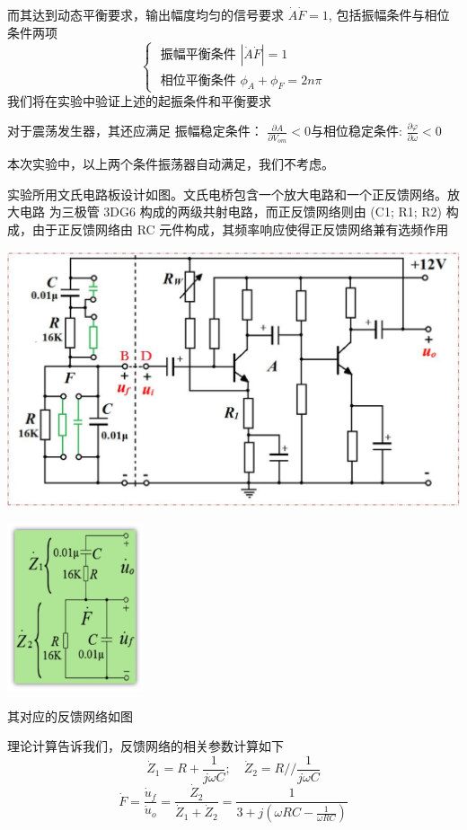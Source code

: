 \documentclass[a4paper,11pt,UTF8]{ctexart}
\begin{document}
而其达到动态平衡要求，输出幅度均匀的信号要求 $\dot{A} \dot{F}=1$, 包括振幅条件与相位条件两项
$$
\left\{\begin{array}{l}
	\text { 振幅平衡条件 }|\dot{A} \dot{F}|=1 \\
	\text { 相位平衡条件 } \phi_{A}+\phi_{F}=2 n \pi
\end{array}\right.
$$
我们将在实验中验证上述的起振条件和平衡要求

对于震荡发生器，其还应满足
振幅稳定条件： $\frac{\partial A}{\partial V_{o m}}<0$与相位稳定条件: $\frac{\partial \varphi}{\partial \omega}<0$


本次实验中，以上两个条件振荡器自动满足，我们不考虑。



实验所用文氏电路板设计如图。文氏电桥包含一个放大电路和一个正反馈网络。放大电路
为三极管 3DG6 构成的两级共射电路，而正反馈网络则由 (C1; R1; R2) 构成，由于正反馈网络由 RC
元件构成，其频率响应使得正反馈网络兼有选频作用

	\includegraphics[width = \textwidth]{实验电路图.png}


\begin{center}
\includegraphics[width=0.3\textwidth]{反馈网络.png}
\end{center}
其对应的反馈网络如图

理论计算告诉我们，反馈网络的相关参数计算如下
$$
\dot{Z}_{1}=R+\frac{1}{j \omega C} ; \quad \dot{Z}_{2}=R / / \frac{1}{j \omega C}
$$
$$
\dot{F}=\frac{\dot{u}_{f}}{\dot{u}_{o}}=\frac{\dot{Z}_{2}}{\dot{Z}_{1}+\dot{Z}_{2}}=\frac{1}{3+j\left(\omega R C-\frac{1}{\omega R C}\right)}
$$
\end{document}
